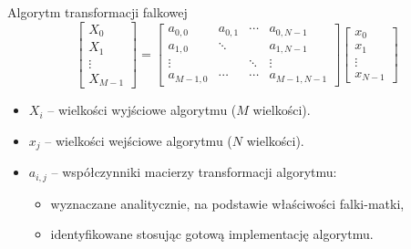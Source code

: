 \documentclass[12pt, polish, aspectratio = 169]{slides}
\begin{document}
\begin{frame}{Algorytm transformacji falkowej}
\begin{equation}
\begin{bmatrix}
X _{0}   \\
X _{1}   \\
\vdots      \\
X _{M-1}
\end{bmatrix}
=
\begin{bmatrix}
a_{0, 0}   &   a_{0, 1} &   \cdots   &   a_{0, N-1}      \\
a_{1, 0}   &   \ddots   &            &   a_{1, N-1}      \\
\vdots     &            &   \ddots   &   \vdots          \\
a_{M-1, 0} &   \cdots   &   \cdots   &   a_{M-1, N-1}
\end{bmatrix}
\begin{bmatrix}
x _{0}   \\
x _{1}   \\
\vdots      \\
x _{N-1}
\end{bmatrix}
\label{eq:alg_out_mat}
\end{equation}
\begin{itemize}
\item $X_{i}$ -- wielkości wyjściowe algorytmu ($M$ wielkości).
\item $x_{j}$ -- wielkości wejściowe algorytmu ($N$ wielkości).
\item $a_{i,j}$ -- współczynniki macierzy transformacji algorytmu:
	\begin{itemize}
	\item wyznaczane analitycznie, na podstawie właściwości falki-matki,
	\item identyfikowane stosując gotową implementację algorytmu.
	\end{itemize}
\end{itemize}
\end{frame}
\end{document}
